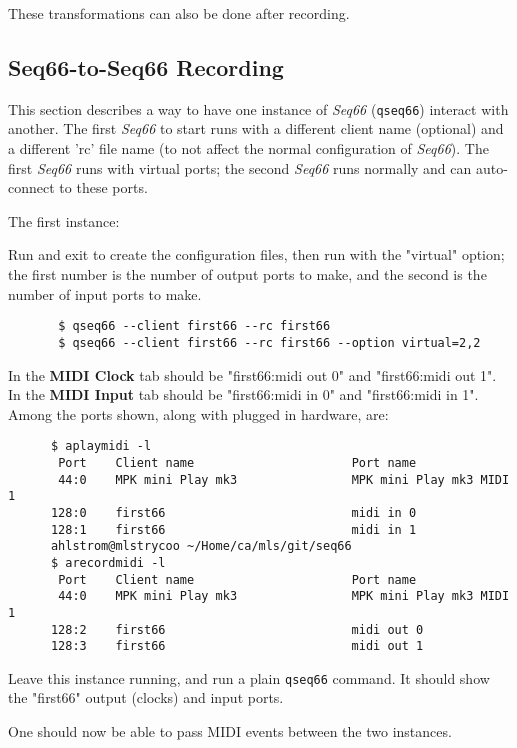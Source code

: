    These transformations can also be done after recording.

\subsection{Seq66-to-Seq66 Recording}
\label{sec:recording_seq_to_seq}

   This section describes a way to have one instance of \textsl{Seq66}
   (\texttt{qseq66}) interact with another.
   The first \textsl{Seq66} to start runs with a different client name
   (optional) and a different 'rc' file name (to not affect the normal
   configuration of \textsl{Seq66}).
   The first \textsl{Seq66} runs with virtual ports; the second
   \textsl{Seq66} runs normally and can auto-connect to these
   ports.

   The first instance:

   Run and exit to create the configuration files, then run with
   the "virtual" option; the first number is the number of output ports
   to make, and the second is the number of input ports to make.

   \begin{verbatim}
       $ qseq66 --client first66 --rc first66
       $ qseq66 --client first66 --rc first66 --option virtual=2,2
   \end{verbatim}

   In the \textbf{MIDI Clock} tab should be "first66:midi out 0" and
   "first66:midi out 1".
   In the \textbf{MIDI Input} tab should be "first66:midi in 0" and
   "first66:midi in 1".
   Among the ports shown, along with plugged in hardware, are:

   \begin{verbatim}
      $ aplaymidi -l
       Port    Client name                      Port name
       44:0    MPK mini Play mk3                MPK mini Play mk3 MIDI 1
      128:0    first66                          midi in 0
      128:1    first66                          midi in 1
      ahlstrom@mlstrycoo ~/Home/ca/mls/git/seq66
      $ arecordmidi -l
       Port    Client name                      Port name
       44:0    MPK mini Play mk3                MPK mini Play mk3 MIDI 1
      128:2    first66                          midi out 0
      128:3    first66                          midi out 1
   \end{verbatim}

   Leave this instance running, and run a plain \texttt{qseq66} command.
   It should show the "first66" output (clocks) and input ports.

   One should now be able to pass MIDI events between the two instances.


